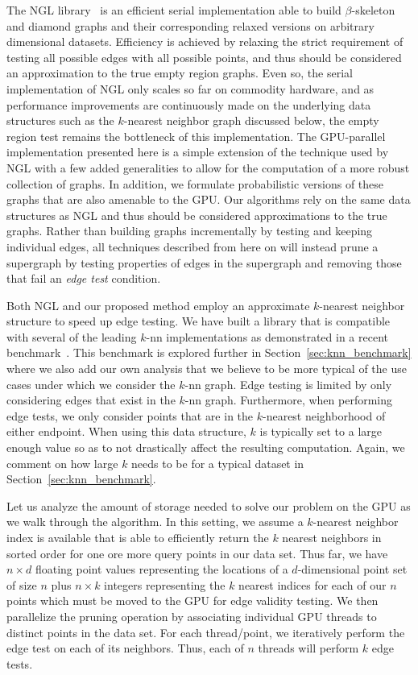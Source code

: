 The NGL library~\cite{CorreaLindstrom2011} is an efficient serial implementation able to build $\beta$-skeleton and diamond graphs and their corresponding relaxed versions on arbitrary dimensional datasets.
%
Efficiency is achieved by relaxing the strict requirement of testing all possible edges with all possible points, and thus should be considered an approximation to the true empty region graphs.
%
Even so, the serial implementation of NGL only scales so far on commodity hardware, and as performance improvements are continuously made on the underlying data structures such as the $k$-nearest neighbor graph discussed below, the empty region test remains the bottleneck of this implementation.
%
The GPU-parallel implementation presented here is a simple extension of the technique used by NGL with a few added generalities to allow for the computation of a more robust collection of graphs.
%
In addition, we formulate probabilistic versions of these graphs that are also amenable to the GPU.
%
Our algorithms rely on the same data structures as NGL and thus should be considered approximations to the true graphs.
%
Rather than building graphs incrementally by testing and keeping individual edges, all techniques described from here on will instead prune a supergraph by testing properties of edges in the supergraph and removing those that fail an \emph{edge test} condition.

Both NGL and our proposed method employ an approximate $k$-nearest neighbor structure to speed up edge testing.
%
We have built a library that is compatible with several of the leading $k$-nn implementations as demonstrated in a recent benchmark~\cite{AumullerBernhardssonFaithfull2017}.
%
This benchmark is explored further in Section~\ref{sec:knn_benchmark} where we also add our own analysis that we believe to be more typical of the use cases under which we consider the $k$-nn graph.
%
Edge testing is limited by only considering edges that exist in the $k$-nn graph.
%
Furthermore, when performing edge tests, we only consider points that are in the $k$-nearest neighborhood of either endpoint.
%
When using this data structure, $k$ is typically set to a large enough value so as to not drastically affect the resulting computation.
%
Again, we comment on how large $k$ needs to be for a typical dataset in Section~\ref{sec:knn_benchmark}.

Let us analyze the amount of storage needed to solve our problem on the GPU as we walk through the algorithm.
%
In this setting, we assume a $k$-nearest neighbor index is available that is able to efficiently return the $k$ nearest neighbors in sorted order for one ore more query points in our data set.
%
Thus far, we have $n \times d$ floating point values representing the locations of a $d$-dimensional point set of size $n$ plus $n \times k$ integers representing the $k$ nearest indices for each of our $n$ points which must be moved to the GPU for edge validity testing.
%
We then parallelize the pruning operation by associating individual GPU threads to distinct points in the data set.
%
For each thread/point, we iteratively perform the edge test on each of its neighbors.
%
Thus, each of $n$ threads will perform $k$ edge tests.

